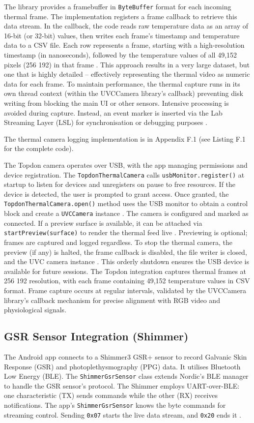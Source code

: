 The library provides a framebuffer in \texttt{ByteBuffer} format for each incoming thermal frame. The implementation registers a frame callback to retrieve this data stream. In the callback, the code reads raw temperature data as an array of 16-bit (or 32-bit) values, then writes each frame's timestamp and temperature data to a CSV file. Each row represents a frame, starting with a high-resolution timestamp (in nanoseconds), followed by the temperature values of all 49{,}152 pixels (256\,\texttimes\,192) in that frame \cite{ref16}. This approach results in a very large dataset, but one that is highly detailed -- effectively representing the thermal video as numeric data for each frame. To maintain performance, the thermal capture runs in its own thread context (within the UVCCamera library's callback) preventing disk writing from blocking the main UI or other sensors. Intensive processing is avoided during capture. Instead, an event marker is inserted via the Lab Streaming Layer (LSL) for synchronisation or debugging purposes \cite{ref9}.

The thermal camera logging implementation is in Appendix F.1 (see Listing F.1 for the complete code).

The Topdon camera operates over USB, with the app managing permissions and device registration. The \texttt{TopdonThermalCamera} calls \texttt{usbMonitor.register()} at startup to listen for devices \cite{ref16} and unregisters on pause to free resources. If the device is detected, the user is prompted to grant access. Once granted, the \texttt{TopdonThermalCamera.open()} method uses the USB monitor to obtain a control block and create a \texttt{UVCCamera} instance \cite{ref16}. The camera is configured and marked as connected. If a preview surface is available, it can be attached via \texttt{startPreview(surface)} to render the thermal feed live \cite{ref16}. Previewing is optional; frames are captured and logged regardless. To stop the thermal camera, the preview (if any) is halted, the frame callback is disabled, the file writer is closed, and the UVC camera instance \cite{ref16}. This orderly shutdown ensures the USB device is available for future sessions. The Topdon integration captures thermal frames at 256\,\texttimes\,192 resolution, with each frame containing 49{,}152 temperature values in CSV format. Frame capture occurs at regular intervals, validated by the UVCCamera library's callback mechanism for precise alignment with RGB video and physiological signals.

\subsection{GSR Sensor Integration (Shimmer)}\label{sec:4-2-2}
The Android app connects to a Shimmer3 GSR+ sensor to record Galvanic Skin Response (GSR) and photoplethysmography (PPG) data. It utilises Bluetooth Low Energy (BLE). The \texttt{ShimmerGsrSensor} class extends Nordic's BLE manager to handle the GSR sensor's protocol. The Shimmer employs UART-over-BLE: one characteristic (TX) sends commands while the other (RX) receives notifications. The app's \texttt{ShimmerGsrSensor} knows the byte commands for streaming control. Sending \texttt{0x07} starts the live data stream, and \texttt{0x20} ends it \cite{ref15}.

